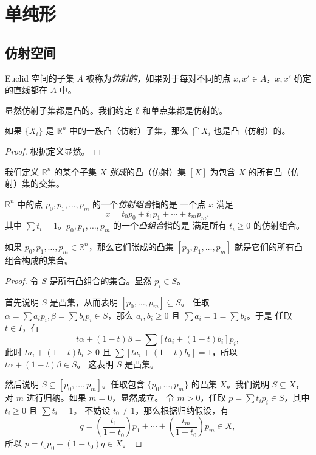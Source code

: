 \documentclass[fontset=none]{Notes}
\begin{document}
\chapter{单纯形}

\section{仿射空间}

\begin{definition}
  Euclid 空间的子集 $A$ 被称为\emph{仿射的}，如果对于每对不同的点
  $x,x'\in A$，$x,x'$ 确定的直线都在 $A$ 中。
\end{definition}

显然仿射子集都是凸的。我们约定 $\emptyset$ 和单点集都是仿射的。

\begin{theorem}
  如果 $\{X_i\}$ 是 $\mathbb{R}^n$ 中的一族凸（仿射）子集，那么 $\bigcap X_i$
  也是凸（仿射）的。
\end{theorem}
\begin{proof}
  根据定义显然。
\end{proof}

我们定义 $\mathbb{R}^n$ 的某个子集 $X$ \emph{张成}的凸（仿射）集
$[X]$ 为包含 $X$ 的所有凸（仿射）集的交集。

\begin{definition}
  $\mathbb{R}^n$ 中的点 $p_0,p_1,\dots,p_m$ 的一个\emph{仿射组合}指的是
  一个点 $x$ 满足
  \[
    x=t_0p_0+t_1p_1+\cdots+t_mp_m,
  \]
  其中 $\sum t_i=1$。$p_0,p_1,\dots,p_m$ 的一个\emph{凸组合}指的是
  满足所有 $t_i\geq 0$ 的仿射组合。
\end{definition}

\begin{theorem}
  如果 $p_0,p_1,\dots,p_m\in \mathbb{R}^n$，那么它们张成的凸集 
  $[p_0,p_1,\dots,p_m]$ 就是它们的所有凸组合构成的集合。
\end{theorem}
\begin{proof}
  令 $S$ 是所有凸组合的集合。显然 $p_i\in S$。

  首先说明 $S$ 是凸集，从而表明 $[p_0,\dots,p_m]\subseteq S$。
  任取 $\alpha=\sum a_ip_i, \beta=\sum b_ip_i\in S$，那么
  $a_i,b_i\geq 0$ 且 $\sum a_i=1=\sum b_i$。于是 
  任取 $t\in I$，有
  \[
    t\alpha+(1-t)\beta=\sum [ta_i+(1-t)b_i]p_i,
  \]
  此时 $ta_i+(1-t)b_i\geq 0$ 且
  $\sum [ta_i+(1-t)b_i]=1$，所以 $t\alpha+(1-t)\beta\in S$。
  这表明 $S$ 是凸集。

  然后说明 $S\subseteq [p_0,\dots,p_m]$。任取包含 $\{p_0,\dots,p_m\}$
  的凸集 $X$。我们说明 $S\subseteq X$，对 $m$ 进行归纳。如果 $m=0$，显然成立。
  令 $m>0$，任取 $p=\sum t_ip_i\in S$，其中 $t_i\geq 0$ 且 $\sum t_i=1$。
  不妨设 $t_0\neq 1$，那么根据归纳假设，有
  \[
    q=\left(\frac{t_1}{1-t_0}\right)p_1+\cdots+
    \left(\frac{t_m}{1-t_0}\right)p_m\in X,
  \]
  所以 $p=t_0p_0+(1-t_0)q\in X$。
\end{proof}
\end{document}
